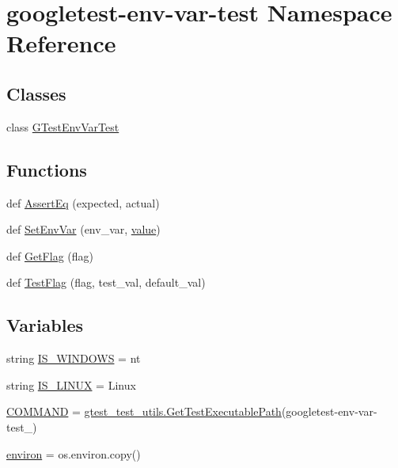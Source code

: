 \hypertarget{namespacegoogletest-env-var-test}{}\section{googletest-\/env-\/var-\/test Namespace Reference}
\label{namespacegoogletest-env-var-test}
\subsection*{Classes}
\begin{DoxyCompactItemize}
\item 
class \mbox{\hyperlink{classgoogletest-env-var-test_1_1_g_test_env_var_test}{G\+Test\+Env\+Var\+Test}}
\end{DoxyCompactItemize}
\subsection*{Functions}
\begin{DoxyCompactItemize}
\item 
def \mbox{\hyperlink{namespacegoogletest-env-var-test_a1dc4462bd3778a92f77f63296bb2a805}{Assert\+Eq}} (expected, actual)
\item 
def \mbox{\hyperlink{namespacegoogletest-env-var-test_a4445af183e70fbd62bf4903ec7447fe6}{Set\+Env\+Var}} (env\+\_\+var, \mbox{\hyperlink{_obj__test_2lib_2googletest-master_2googlemock_2test_2gmock-matchers__test_8cc_a337b8a670efc0b086ad3af163f3121b6}{value}})
\item 
def \mbox{\hyperlink{namespacegoogletest-env-var-test_a5e599696d970929ff7836e5329e1350f}{Get\+Flag}} (flag)
\item 
def \mbox{\hyperlink{namespacegoogletest-env-var-test_a7b8631f31d258198990b9a6004faa8a7}{Test\+Flag}} (flag, test\+\_\+val, default\+\_\+val)
\end{DoxyCompactItemize}
\subsection*{Variables}
\begin{DoxyCompactItemize}
\item 
string \mbox{\hyperlink{namespacegoogletest-env-var-test_ae045d8de4820c83223f27ff1c2699fc7}{I\+S\+\_\+\+W\+I\+N\+D\+O\+WS}} = \textquotesingle{}nt\textquotesingle{}
\item 
string \mbox{\hyperlink{namespacegoogletest-env-var-test_a55c1ed746133ca7a86a9d5c19e6cc05c}{I\+S\+\_\+\+L\+I\+N\+UX}} = \textquotesingle{}Linux\textquotesingle{}
\item 
\mbox{\hyperlink{namespacegoogletest-env-var-test_a1973327f302e133104ae3ad3eecf17f3}{C\+O\+M\+M\+A\+ND}} = \mbox{\hyperlink{namespacegtest__test__utils_a89ed3717984a80ffbb7a9c92f71b86a2}{gtest\+\_\+test\+\_\+utils.\+Get\+Test\+Executable\+Path}}(\textquotesingle{}googletest-\/env-\/var-\/test\+\_\+\textquotesingle{})
\item 
\mbox{\hyperlink{namespacegoogletest-env-var-test_ade23d144de09227d3ee09500bddcffd2}{environ}} = os.\+environ.\+copy()
\end{DoxyCompactItemize}


